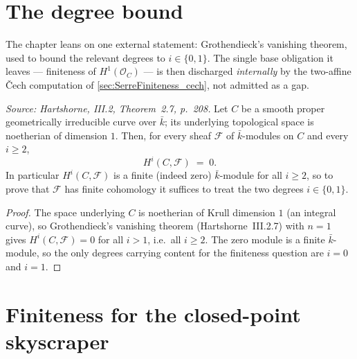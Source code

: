 \section{The degree bound}
\label{sec:SerreFiniteness_inputs}

The chapter leans on one external statement: Grothendieck's vanishing
theorem, used to bound the relevant degrees to \(i \in \{0, 1\}\). The
single base obligation it leaves --- finiteness of \(H^1(\mathcal O_C)\)
--- is then discharged \emph{internally} by the two-affine Čech
computation of \cref{sec:SerreFiniteness_cech}, not admitted as a gap.

\begin{lemma}
  \label{lem:grothendieck_vanishing_curve}
  \textit{Source: Hartshorne, III.2, Theorem~2.7, p.~208.}
  Let \(C\) be a smooth proper geometrically irreducible curve over
  \(\bar k\); its underlying topological space is noetherian of
  dimension \(1\). Then, for every sheaf \(\mathcal F\) of
  \(\bar k\)-modules on \(C\) and every \(i \ge 2\),
  \[
    H^i(C, \mathcal F) \;=\; 0.
  \]
  In particular \(H^i(C, \mathcal F)\) is a finite (indeed zero)
  \(\bar k\)-module for all \(i \ge 2\), so to prove that \(\mathcal F\)
  has finite cohomology it suffices to treat the two degrees
  \(i \in \{0, 1\}\).
\end{lemma}

\begin{proof}
  The space underlying \(C\) is noetherian of Krull dimension \(1\)
  (an integral curve), so Grothendieck's vanishing theorem
  (Hartshorne~III.2.7) with \(n = 1\) gives
  \(H^i(C, \mathcal F) = 0\) for all \(i > 1\), i.e.\ all \(i \ge 2\).
  The zero module is a finite \(\bar k\)-module, so the only degrees
  carrying content for the finiteness question are \(i = 0\) and
  \(i = 1\).
\end{proof}

\section{Finiteness for the closed-point skyscraper}
\label{sec:SerreFiniteness_skyscraper}

